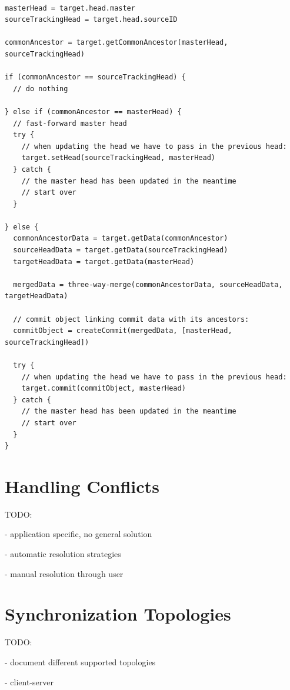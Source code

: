 \begin{lstlisting}[caption=Merging Protocol, label=merging-protocol]

masterHead = target.head.master
sourceTrackingHead = target.head.sourceID

commonAncestor = target.getCommonAncestor(masterHead, sourceTrackingHead)

if (commonAncestor == sourceTrackingHead) {
  // do nothing

} else if (commonAncestor == masterHead) {
  // fast-forward master head
  try {
    // when updating the head we have to pass in the previous head:
    target.setHead(sourceTrackingHead, masterHead)
  } catch {
    // the master head has been updated in the meantime
    // start over
  }

} else {
  commonAncestorData = target.getData(commonAncestor)
  sourceHeadData = target.getData(sourceTrackingHead)
  targetHeadData = target.getData(masterHead)

  mergedData = three-way-merge(commonAncestorData, sourceHeadData, targetHeadData)

  // commit object linking commit data with its ancestors:
  commitObject = createCommit(mergedData, [masterHead, sourceTrackingHead])

  try {
    // when updating the head we have to pass in the previous head:
    target.commit(commitObject, masterHead)    
  } catch {
    // the master head has been updated in the meantime
    // start over
  }
}

\end{lstlisting}

\section{Handling Conflicts}

TODO:

- application specific, no general solution

- automatic resolution strategies

- manual resolution through user

\section{Synchronization Topologies}

TODO:

- document different supported topologies

- client-server

